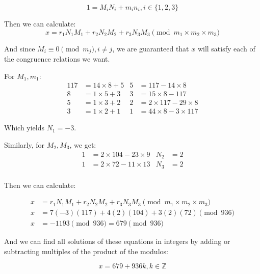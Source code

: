 \documentclass{article}
\begin{document}
\[ 1 = M_i N_i + m_i n_i, i\in \{1,2,3\}\]

Then we can calculate:
\[x = r_1 N_1 M_1 + r_2 N_2 M_2 + r_3 N_3 M_3 \pmod{m_1 \times m_2 \times m_3}\]

And since $M_i \equiv 0 \pmod{m_j}, i \neq j$, we are guaranteed that $x$ will
satisfy each of the congruence relations we want.

For $M_1,m_1$:
\begin{align*}
	117 &= 14 \times 8 + 5 & 5 &= 117 - 14 \times 8 \\
	8   &= 1 \times 5 + 3  & 3 &= 15 \times 8 - 117 \\
	5   &= 1 \times 3 + 2  & 2 &= 2 \times 117 - 29 \times 8 \\
	3   &= 1 \times 2 + 1  & 1 &= 44 \times 8 -3 \times 117
\end{align*}

Which yields $N_1 = -3$.

Similarly, for $M_2, M_3$, we get:
\begin{align*}
	1 &= 2 \times 104 - 23 \times 9 & N_2 &= 2 \\
	1 &= 2 \times 72 - 11 \times 13 & N_3 &= 2 \\
\end{align*}

Then we can calculate:

\begin{align*}
	x &= r_1 N_1 M_1 + r_2 N_2 M_2 + r_3 N_3 M_3 \pmod{m_1 \times m_2 \times m_3} \\
	x &= 7(-3)(117)+4(2)(104)+3(2)(72) \pmod{936} \\
	x &= -1193 \pmod{936} = 679 \pmod{936} 
\end{align*}

And we can find all solutions of these equations in integers by adding or
subtracting multiples of the product of the modulos:

\[ x = 679 + 936k, k \in \mathbb{Z} \]
\end{document}
